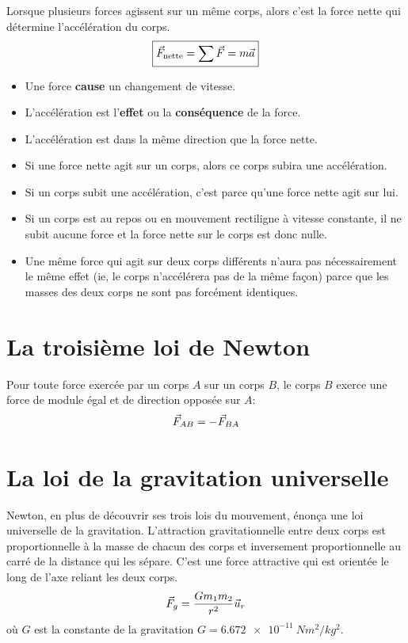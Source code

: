 Lorsque plusieurs forces agissent sur un même corps, alors c'est la force nette
qui détermine l'accélération du corps.
\[
  \boxed{\vec{F}_\mathrm{nette} = \sum \vec{F} = m\vec{a}}
\]

\begin{itemize}
  \item Une force \textbf{cause} un changement de vitesse.
  \item L'accélération est l'\textbf{effet} ou la \textbf{conséquence} de la force.
  \item L'accélération est dans la même direction que la force nette.
  \item Si une force nette agit sur un corps, alors ce corps subira une accélération.
  \item Si un corps subit une accélération, c'est parce qu'une force nette agit sur lui.
  \item Si un corps est au repos ou en mouvement rectiligne à vitesse
    constante, il ne subit aucune force et la force nette sur le corps est donc
    nulle.
  \item Une même force qui agit sur deux corps différents n'aura pas
    nécessairement le même effet (ie, le corps n'accélérera pas de la même
    façon) parce que les masses des deux corps ne sont pas forcément
    identiques.
\end{itemize}


\section{La troisième loi de Newton}

Pour toute force exercée par un corps $A$ sur un corps $B$, le corps $B$ exerce
une force de module égal et de direction opposée sur $A$:
\[
  \vec{F}_{AB} = -\vec{F}_{BA}
\]



\section{La loi de la gravitation universelle}

Newton, en plus de découvrir ses trois lois du mouvement, énonça une loi
universelle de la gravitation.  L'attraction gravitationnelle entre deux corps
est proportionnelle à la masse de chacun des corps et inversement
proportionnelle au carré de la distance qui les sépare.  C'est une force
attractive qui est orientée le long de l'axe reliant les deux corps.
\[
  \vec{F}_g = \frac{Gm_1m_2}{r^2} \vec{u}_r
\]
où $G$ est la constante de la gravitation $G = \SI{6.672e-11}{Nm^2/kg^2}$.
